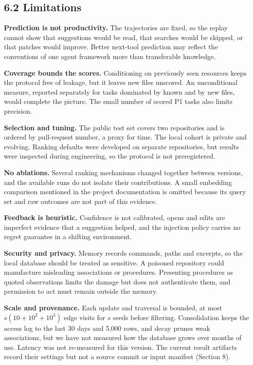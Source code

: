 \documentclass[
  american,
  11pt,
]{article}
\begin{document}
\subsection{6.2 Limitations}\label{limitations}

\textbf{Prediction is not productivity.} The trajectories are fixed, so the replay cannot show that
suggestions would be read, that searches would be skipped, or that patches would improve. Better next-tool
prediction may reflect the conventions of one agent framework more than transferable knowledge.

\textbf{Coverage bounds the scores.} Conditioning on previously seen resources keeps the protocol free of
leakage, but it leaves new files unscored. An unconditional measure, reported separately for tasks dominated
by known and by new files, would complete the picture. The small number of scored P1 tasks also limits
precision.

\textbf{Selection and tuning.} The public test set covers two repositories and is ordered by pull-request
number, a proxy for time. The local cohort is private and evolving. Ranking defaults were developed on
separate repositories, but results were inspected during engineering, so the protocol is not preregistered.

\textbf{No ablations.} Several ranking mechanisms changed together between versions, and the available runs do
not isolate their contributions. A small embedding comparison mentioned in the project documentation is
omitted because its query set and raw outcomes are not part of this evidence.

\textbf{Feedback is heuristic.} Confidence is not calibrated, opens and edits are imperfect evidence that a
suggestion helped, and the injection policy carries no regret guarantee in a shifting environment.

\textbf{Security and privacy.} Memory records commands, paths and excerpts, so the local database should be
treated as sensitive. A poisoned repository could manufacture misleading associations or procedures.
Presenting procedures as quoted observations limits the damage but does not authenticate them, and permission
to act must remain outside the memory.

\textbf{Scale and provenance.} Each update and traversal is bounded, at most \(s(10+10^2+10^3)\) edge visits
for \(s\) seeds before filtering. Consolidation keeps the access log to the last 30 days and 5,000 rows, and
decay prunes weak associations, but we have not measured how the database grows over months of use. Latency
was not re-measured for this version. The current result artifacts record their settings but not a source
commit or input manifest (Section 8).
\end{document}
